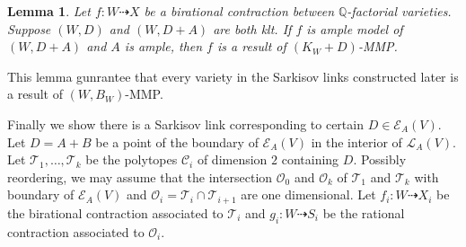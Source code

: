 \documentclass[11pt]{amsart}
\numberwithin{equation}{section}
\newtheorem{lem}[defn]{Lemma}
\begin{document}
\begin{lem}
  \cite[Lemma 3.6]{haconSarkisovProgram2012} Let $f:W\dashrightarrow X $ be a birational contraction between $\mathbb{Q}$-factorial varieties. Suppose $(W,D)$ and $(W,D+A)$ are both klt. If $f$ is ample model of $(W,D+A)$ and $A$ is ample, then $f$ is a result of  $(K_{W}+D)$-MMP.
\end{lem}
This lemma gunrantee that every variety in the Sarkisov links constructed later is a result of $(W,B_{W})$-MMP.

Finally we show there is a Sarkisov link corresponding to certain $D \in \mathcal{E}_{A}(V)$. Let $ D=A+B $ be a point of the boundary of $ \mathcal{E}_A(V) $ in the interior of $ \mathcal{L}_A(V) $. Let $ \mathcal{T}_1, \ldots, \mathcal{T}_k $ be the polytopes $ \mathcal{C}_i $ of dimension $ 2 $ containing $ D $. Possibly reordering, we may assume that  the intersection  $ \mathcal{O}_0 $ and $ \mathcal{O}_k $ of $ \mathcal{T}_1 $ and $ \mathcal{T}_k $ with boundary of $ \mathcal{E}_A(V) $ and  $ \mathcal{O}_i=\mathcal{T}_i\cap\mathcal{T}_{i+1} $ are one dimensional. Let $ f_i:W\dashrightarrow  X_i $ be the birational contraction associated to $ \mathcal{T}_i $ and $ g_i:W\dashrightarrow  S_i $ be the rational contraction associated to $ \mathcal{O}_i $.
\begin{center}
\end{center}
\end{document}
